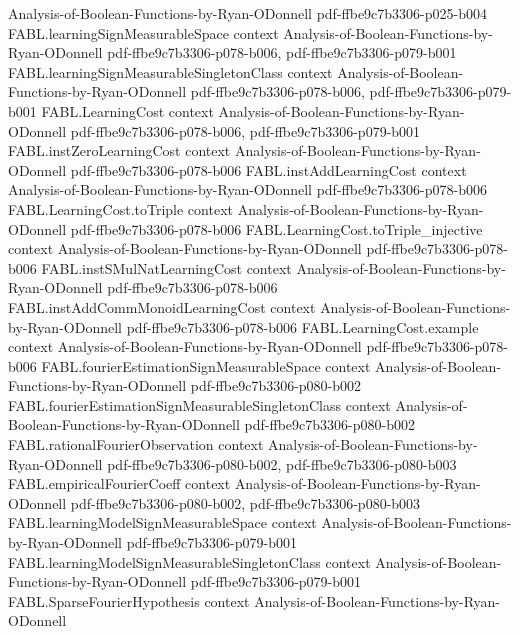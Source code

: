 \begin{theorem}
  {Analysis-of-Boolean-Functions-by-Ryan-ODonnell}
  {pdf-ffbe9c7b3306-p025-b004}
\proofstep
  {FABL.learningSignMeasurableSpace}
  {context}
  {Analysis-of-Boolean-Functions-by-Ryan-ODonnell}
  {pdf-ffbe9c7b3306-p078-b006,
    pdf-ffbe9c7b3306-p079-b001}
\proofstep
  {FABL.learningSignMeasurableSingletonClass}
  {context}
  {Analysis-of-Boolean-Functions-by-Ryan-ODonnell}
  {pdf-ffbe9c7b3306-p078-b006,
    pdf-ffbe9c7b3306-p079-b001}
\proofstep
  {FABL.LearningCost}
  {context}
  {Analysis-of-Boolean-Functions-by-Ryan-ODonnell}
  {pdf-ffbe9c7b3306-p078-b006,
    pdf-ffbe9c7b3306-p079-b001}
\proofstep
  {FABL.instZeroLearningCost}
  {context}
  {Analysis-of-Boolean-Functions-by-Ryan-ODonnell}
  {pdf-ffbe9c7b3306-p078-b006}
\proofstep
  {FABL.instAddLearningCost}
  {context}
  {Analysis-of-Boolean-Functions-by-Ryan-ODonnell}
  {pdf-ffbe9c7b3306-p078-b006}
\proofstep
  {FABL.LearningCost.toTriple}
  {context}
  {Analysis-of-Boolean-Functions-by-Ryan-ODonnell}
  {pdf-ffbe9c7b3306-p078-b006}
\proofstep
  {FABL.LearningCost.toTriple_injective}
  {context}
  {Analysis-of-Boolean-Functions-by-Ryan-ODonnell}
  {pdf-ffbe9c7b3306-p078-b006}
\proofstep
  {FABL.instSMulNatLearningCost}
  {context}
  {Analysis-of-Boolean-Functions-by-Ryan-ODonnell}
  {pdf-ffbe9c7b3306-p078-b006}
\proofstep
  {FABL.instAddCommMonoidLearningCost}
  {context}
  {Analysis-of-Boolean-Functions-by-Ryan-ODonnell}
  {pdf-ffbe9c7b3306-p078-b006}
\proofstep
  {FABL.LearningCost.example}
  {context}
  {Analysis-of-Boolean-Functions-by-Ryan-ODonnell}
  {pdf-ffbe9c7b3306-p078-b006}
\proofstep
  {FABL.fourierEstimationSignMeasurableSpace}
  {context}
  {Analysis-of-Boolean-Functions-by-Ryan-ODonnell}
  {pdf-ffbe9c7b3306-p080-b002}
\proofstep
  {FABL.fourierEstimationSignMeasurableSingletonClass}
  {context}
  {Analysis-of-Boolean-Functions-by-Ryan-ODonnell}
  {pdf-ffbe9c7b3306-p080-b002}
\proofstep
  {FABL.rationalFourierObservation}
  {context}
  {Analysis-of-Boolean-Functions-by-Ryan-ODonnell}
  {pdf-ffbe9c7b3306-p080-b002,
    pdf-ffbe9c7b3306-p080-b003}
\proofstep
  {FABL.empiricalFourierCoeff}
  {context}
  {Analysis-of-Boolean-Functions-by-Ryan-ODonnell}
  {pdf-ffbe9c7b3306-p080-b002,
    pdf-ffbe9c7b3306-p080-b003}
\proofstep
  {FABL.learningModelSignMeasurableSpace}
  {context}
  {Analysis-of-Boolean-Functions-by-Ryan-ODonnell}
  {pdf-ffbe9c7b3306-p079-b001}
\proofstep
  {FABL.learningModelSignMeasurableSingletonClass}
  {context}
  {Analysis-of-Boolean-Functions-by-Ryan-ODonnell}
  {pdf-ffbe9c7b3306-p079-b001}
\proofstep
  {FABL.SparseFourierHypothesis}
  {context}
  {Analysis-of-Boolean-Functions-by-Ryan-ODonnell}

\end{theorem}
